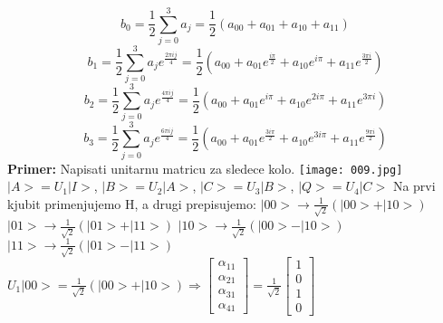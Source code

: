\documentclass{article}
\begin{document}
\newline\hspace*{0.6cm}
$$b_0 = \frac{1}{2}\sum_{j=0}^3 a_j = \frac{1}{2}(a_{00} + a_{01} + a_{10} + a_{11})$$
$$b_1 = \frac{1}{2}\sum_{j=0}^3 a_j e^\frac{2\pi ij}{4} = \frac{1}{2}(a_{00} + a_{01}e^\frac{i\pi}{2} + a_{10}e^{i\pi} + a_{11}e^\frac{3\pi i}{2})$$
$$b_2 = \frac{1}{2}\sum_{j=0}^3 a_j e^\frac{4\pi ij}{4} = \frac{1}{2}(a_{00} + a_{01}e^{i\pi} + a_{10}e^{2i\pi} + a_{11}e^{3\pi i})$$
$$b_3 = \frac{1}{2}\sum_{j=0}^3 a_j e^\frac{6\pi ij}{4} = \frac{1}{2}(a_{00} + a_{01}e^\frac{3i\pi}{2} + a_{10}e^{3i\pi} + a_{11}e^\frac{9\pi i}{2})$$
\vspace{0.4cm}\newline
\textbf{Primer:} Napisati unitarnu matricu za sledece kolo.
\newline
\texttt{[image: 009.jpg]}
\newline
$|A> = U_1|I>$, $|B> = U_2|A>$, $|C> = U_3|B>$, $|Q> = U_4|C>$
\vspace{0.3cm}\newline
Na prvi kjubit primenjujemo H, a drugi prepisujemo:
\newline \hspace*{0.2cm}
$|00> \longrightarrow \frac{1}{\sqrt{2}}(|00> + |10>)$
\newline\hspace*{0.2cm}
$|01> \longrightarrow \frac{1}{\sqrt{2}}(|01> + |11>)$
\newline\hspace*{0.2cm}
$|10> \longrightarrow \frac{1}{\sqrt{2}}(|00> - |10>)$
\newline\hspace*{0.2cm}
$|11> \longrightarrow \frac{1}{\sqrt{2}}(|01> - |11>)$
\newline\hspace*{0.4cm}
$U_1|00> = \frac{1}{\sqrt{2}}(|00> + |10>) \Rightarrow \begin{bmatrix}
    \alpha_{11}\\
    \alpha_{21}\\
    \alpha_{31}\\
    \alpha_{41}
\end{bmatrix} = \frac{1}{\sqrt{2}}\begin{bmatrix}
    1\\
    0\\
    1\\
    0
\end{bmatrix}$
\newline\hspace*{0.4cm}
\end{document}
